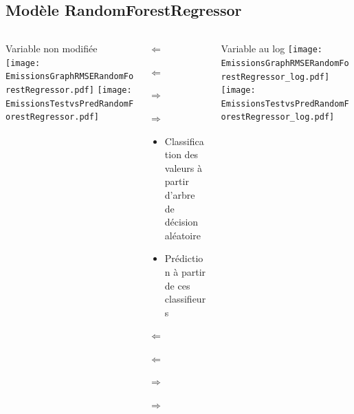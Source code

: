 \documentclass[8pt,aspectratio=169,hyperref={unicode=true}]{beamer}
\begin{document}
\subsection{Modèle RandomForestRegressor}
\begin{frame}{\insertsubsection}
  \begin{columns}[t]
    \begin{column}{.33\textwidth}
      \centering Variable non modifiée
      \texttt{[image: EmissionsGraphRMSERandomForestRegressor.pdf]}
      \texttt{[image: EmissionsTestvsPredRandomForestRegressor.pdf]}
    \end{column}
    \begin{column}{.33\textwidth}
      $\Longleftarrow$

      {\footnotesize
          }

      \raggedright
      $\Longleftarrow$

      \raggedleft
      $\Longrightarrow$

      {\footnotesize
          }

      \raggedleft
      $\Longrightarrow$

      \raggedright
      \begin{itemize}
        \item Classification des valeurs à partir d'arbre de décision aléatoire
        \item Prédiction à partir de ces classifieurs
      \end{itemize}

      $\Longleftarrow$
      {\scriptsize \centering
          }

      $\Longleftarrow$

      \raggedleft
      $\Longrightarrow$

      {\scriptsize \centering
          
        }
      \raggedleft
      $\Longrightarrow$
    \end{column}
    \begin{column}{.33\textwidth}
      \centering Variable au log
      \texttt{[image: EmissionsGraphRMSERandomForestRegressor\_log.pdf]}
      \texttt{[image: EmissionsTestvsPredRandomForestRegressor\_log.pdf]}
    \end{column}
  \end{columns}
\end{frame}
\end{document}
